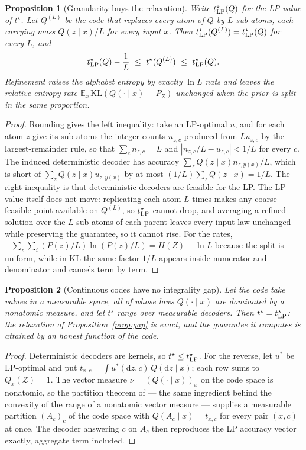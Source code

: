 \documentclass[11pt]{article}
\newtheorem{proposition}{Proposition}
\begin{document}
\begin{proposition}[Granularity buys the relaxation]\label{prop:gran}
Write $t^\star_{\rm LP}(Q)$ for the LP value of $t^\star$. Let $Q^{(L)}$ be the code that replaces
every atom of $Q$ by $L$ sub-atoms, each carrying mass $Q(z\mid x)/L$ for every input $x$. Then
$t^\star_{\rm LP}(Q^{(L)})=t^\star_{\rm LP}(Q)$ for every $L$, and
\[
t^\star_{\rm LP}(Q)-\frac1L\ \le\ t^\star(Q^{(L)})\ \le\ t^\star_{\rm LP}(Q).
\]
Refinement raises the alphabet entropy by exactly $\ln L$ nats and leaves the
relative-entropy rate $\mathbb E_x\,\mathrm{KL}(Q(\cdot\mid x)\,\|\,P_Z)$ unchanged when the
prior is split in the same proportion.
\end{proposition}
\begin{proof}
Rounding gives the left inequality: take an LP-optimal $u$, and for each atom $z$ give its
sub-atoms the integer counts $n_{z,c}$ produced from $L u_{z,c}$ by the largest-remainder rule,
so that $\sum_c n_{z,c}=L$ and $|n_{z,c}/L-u_{z,c}|<1/L$ for every $c$. The induced deterministic
decoder has accuracy $\sum_z Q(z\mid x)n_{z,y(x)}/L$, which is short of
$\sum_z Q(z\mid x)u_{z,y(x)}$ by at most $(1/L)\sum_z Q(z\mid x)=1/L$. The right inequality is
that deterministic decoders are feasible for the LP. The LP value itself does not move: replicating
each atom $L$ times makes any coarse feasible point available on $Q^{(L)}$, so $t^\star_{\rm LP}$
cannot drop, and averaging a refined solution over the $L$ sub-atoms of each parent leaves every
input law unchanged while preserving the guarantee, so it cannot rise. For the rates,
$-\sum_z\sum_i (P(z)/L)\ln(P(z)/L)=H(Z)+\ln L$ because the split is uniform, while in
$\mathrm{KL}$ the same factor $1/L$ appears inside numerator and denominator and cancels term by
term.
\end{proof}

\begin{proposition}[Continuous codes have no integrality gap]\label{prop:atomless}
Let the code take values in a measurable space, all of whose laws $Q(\cdot\mid x)$ are dominated by
a nonatomic measure, and let $t^\star$ range over measurable decoders. Then $t^\star=t^\star_{\rm
LP}$: the relaxation of Proposition~\ref{prop:gap} is exact, and the guarantee it computes is
attained by an honest function of the code.
\end{proposition}
\begin{proof}
Deterministic decoders are kernels, so $t^\star\le t^\star_{\rm LP}$. For the reverse, let $u^*$ be
LP-optimal and put $t_{x,c}=\int u^*(\mathrm dz,c)\,Q(\mathrm dz\mid x)$; each row sums to
$Q_x(\mathcal Z)=1$. The vector measure $\nu=(Q(\cdot\mid x))_{x}$ on the code space is nonatomic,
so the partition theorem of \citet{dvoretzky1951} --- the same ingredient behind the convexity of
the range of a nonatomic vector measure \citep{lyapunov1940} --- supplies a measurable partition
$(A_c)_c$ of the code space with $Q(A_c\mid x)=t_{x,c}$ for every pair $(x,c)$ at once. The decoder
answering $c$ on $A_c$ then reproduces the LP accuracy vector exactly, aggregate term included.
\end{proof}
\end{document}
